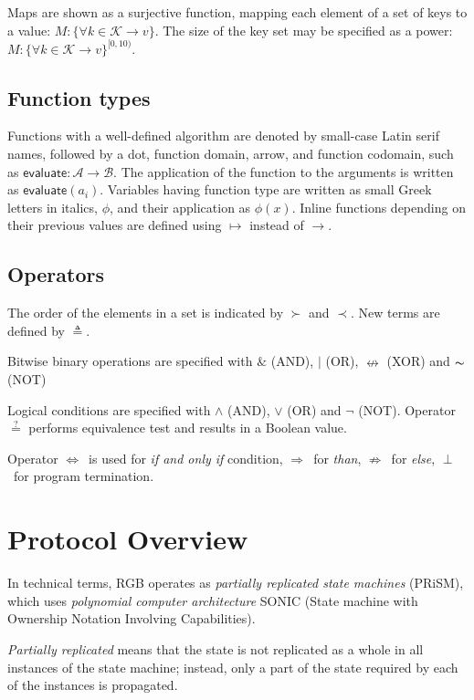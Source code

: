 \documentclass[9pt,oneside]{amsart}
\begin{document}
\begin{multicols}{2}
Maps are shown as a surjective function, mapping each element of a set of keys to a value:
$M: \{ \forall k \in \mathcal{K} \rightarrow v \}$.
The size of the key set may be specified as a power:
$M: \{ \forall k \in \mathcal{K} \rightarrow v \}^{[0, 10)}$.

\subsection{Function types}

Functions with a well-defined algorithm are denoted by small-case Latin serif names,
followed by a dot, function domain, arrow, and function codomain,
such as $\mathsf{evaluate}: \mathcal{A} \rightarrow \mathcal{B}$.
The application of the function to the arguments is written as $\mathsf{evaluate}(a_i)$.
Variables having function type are written as small Greek letters in italics, $\phi$,
and their application as $\phi(x)$.
Inline functions depending on their previous values are defined using
$\mapsto$ instead of $\rightarrow$.

\subsection{Operators}
The order of the elements in a set is indicated by $\succ$ and $\prec$.
New terms are defined by $\triangleq$.

Bitwise binary operations are specified with $\&$ (AND), $|$ (OR),
$\nleftrightarrow$ (XOR) and $\thicksim$ (NOT)

Logical conditions are specified with $\land$ (AND), $\lor$ (OR) and $\lnot$ (NOT).
Operator $\stackrel{?}{=}$ performs equivalence test and results in a Boolean value.

Operator $\Longleftrightarrow$~is used for \emph{if and only if} condition,
$\Rightarrow$~for \emph{than}, $\nRightarrow$~for \emph{else}, $\perp$~for program termination.

\section{Protocol Overview}

In technical terms, RGB operates as \emph{partially replicated state machines} (PRiSM),
which uses \emph{polynomial computer architecture} SONIC
(State machine with Ownership Notation Involving Capabilities).

\emph{Partially replicated} means that the state is not replicated
as a whole in all instances of the state machine;
instead, only a part of the state required by each of the instances is propagated.


\end{multicols}
\end{document}
